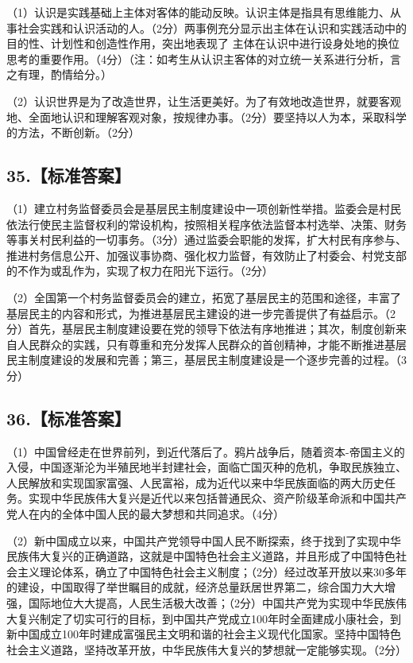 \documentclass[UTF8,11pt]{ctexart}
\begin{document}
（1）认识是实践基础上主体对客体的能动反映。认识主体是指具有思维能力、从事社会实践和认识活动的人。（2分）两事例充分显示出主体在认识和实践活动中的目的性、计划性和创造性作用，突出地表现了 主体在认识中进行设身处地的换位思考的重要作用。（4分）（注：如考生从认识主客体的对立统一关系进行分析，言之有理，酌情给分。）


（2）认识世界是为了改造世界，让生活更美好。为了有效地改造世界，就要客观地、全面地认识和理解客观对象，按规律办事。（2分）要坚持以人为本，采取科学的方法，不断创新。（2分）


\subsection*{35.【标准答案】}

（1）建立村务监督委员会是基层民主制度建设中一项创新性举措。监委会是村民依法行使民主监督权利的常设机构，按照相关程序依法监督本村选举、决策、财务等事关村民利益的一切事务。（3分）通过监委会职能的发挥，扩大村民有序参与、推进村务信息公开、加强议事协商、强化权力监督，有效防止了村委会、村党支部的不作为或乱作为，实现了权力在阳光下运行。（2分）


（2）全国第一个村务监督委员会的建立，拓宽了基层民主的范围和途径，丰富了基层民主的内容和形式，为推进基层民主建设的进一步完善提供了有益启示。（2分）首先，基层民主制度建设要在党的领导下依法有序地推进；其次，制度创新来自人民群众的实践，只有尊重和充分发挥人民群众的首创精神，才能不断推进基层民主制度建设的发展和完善；第三，基层民主制度建设是一个逐步完善的过程。（3分）


\subsection*{36.【标准答案】}

（1）中国曾经走在世界前列，到近代落后了。鸦片战争后，随着资本-帝国主义的入侵，中国逐渐沦为半殖民地半封建社会，面临亡国灭种的危机，争取民族独立、人民解放和实现国家富强、人民富裕，成为近代以来中华民族面临的两大历史任务。实现中华民族伟大复兴是近代以来包括普通民众、资产阶级革命派和中国共产党人在内的全体中国人民的最大梦想和共同追求。（4分）


（2）新中国成立以来，中国共产党领导中国人民不断探索，终于找到了实现中华民族伟大复兴的正确道路，这就是中国特色社会主义道路，并且形成了中国特色社会主义理论体系，确立了中国特色社会主义制度；（2分）经过改革开放以来30多年的建设，中国取得了举世瞩目的成就，经济总量跃居世界第二，综合国力大大增强，国际地位大大提高，人民生活极大改善；（2分）中国共产党为实现中华民族伟大复兴制定了切实可行的目标，到中国共产党成立100年时全面建成小康社会，到新中国成立100年时建成富强民主文明和谐的社会主义现代化国家。坚持中国特色社会主义道路，坚持改革开放，中华民族伟大复兴的梦想就一定能够实现。（2分）
\end{document}
